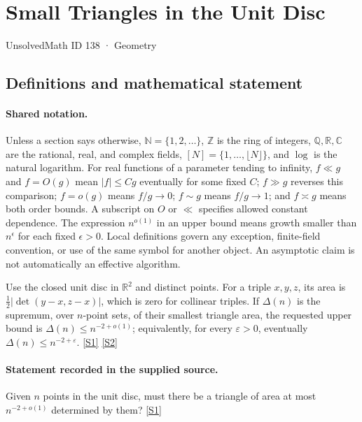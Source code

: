 \documentclass[11pt,a4paper]{article}
\newcommand{\N}{\mathbb{N}}
\newcommand{\Z}{\mathbb{Z}}
\newcommand{\Q}{\mathbb{Q}}
\newcommand{\R}{\mathbb{R}}
\newcommand{\C}{\mathbb{C}}
\newcommand{\sref}[2]{\hyperlink{source:#1:#2}{[S#2]}}
\begin{document}

\setcounter{section}{137}

\section{Small Triangles in the Unit Disc}\label{138}

{\small\sffamily UnsolvedMath ID 138 · Geometry}

\subsection{Definitions and mathematical statement}

\paragraph{Shared notation.}Unless a section says otherwise, $\N=\{1,2,\ldots\}$,
$\Z$ is the ring of integers, $\Q,\R,\C$ are the rational, real, and complex
fields, $[N]=\{1,\ldots,\lfloor N\rfloor\}$, and $\log$ is the natural
logarithm. For real functions of a parameter tending to infinity,
$f\ll g$ and $f=O(g)$ mean $|f|\leq Cg$ eventually for some fixed $C$;
$f\gg g$ reverses this comparison; $f=o(g)$ means $f/g\to0$;
$f\sim g$ means $f/g\to1$; and $f\asymp g$ means both order bounds.
A subscript on $O$ or $\ll$ specifies allowed constant dependence.
The expression $n^{o(1)}$ in an upper bound means growth smaller than
$n^\epsilon$ for each fixed $\epsilon>0$. Local definitions govern any
exception, finite-field convention, or use of the same symbol for another
object. An asymptotic claim is not automatically an effective algorithm.



Use the closed unit disc in $\R^2$ and distinct points. For a triple $x,y,z$, its area is $\tfrac12|\det(y-x,z-x)|$, which is zero for collinear triples. If $\Delta(n)$ is the supremum, over $n$-point sets, of their smallest triangle area, the requested upper bound is $\Delta(n)\leq n^{-2+o(1)}$; equivalently, for every $\varepsilon>0$, eventually $\Delta(n)\leq n^{-2+\varepsilon}$. \sref{138}{1} \sref{138}{2}

\paragraph{Statement recorded in the supplied source.}
Given $n$ points in the unit disc, must there be a triangle of area at most $n^{-2+o(1)}$ determined by them? \sref{138}{1}
\end{document}
